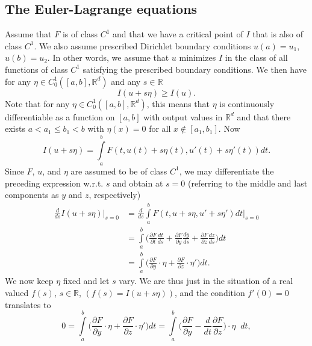 \documentclass{article}
\theoremstyle{definition}
\theoremstyle{remark}
\theoremstyle{definition}
\begin{document}
    \subsection{The Euler-Lagrange equations}
        Assume that $F$ is of class $C^1$ and that we have a critical point of $I$ that is also of class $C^1$. We also assume prescribed Dirichlet boundary conditions $u(a)=u_1$, $u(b)=u_2$. In other words, we assume that $u$ minimizes $I$ in the class of all functions of class $C^1$ satisfying the prescribed boundary conditions. We then have for any $\eta\in C_0^1([a,b],\mathbb{R}^d)$ and any $s\in\mathbb{R}$
            \begin{equation*}
                I(u+s\eta)\geq I(u).
            \end{equation*}
        \noindent Note that for any $\eta\in C_0^1([a,b],\mathbb{R}^d)$, this means that $\eta$ is continuously differentiable as a function on $[a,b]$ with output values in $\mathbb{R}^d$ and that there exists $a<a_1\leq b_1< b$ with $\eta(x)=0$ for all $x\notin[a_1,b_1]$. Now 
            \begin{equation*}
                I(u+s\eta)=\int\limits_a^b F(t,u(t)+s\eta(t),u'(t)+s\eta'(t))dt.
            \end{equation*}
        Since $F$, $u$, and $\eta$ are assumed to be of class $C^1$, we may differentiate the preceding expression w.r.t. $s$ and obtain at $s=0$ (referring to the middle and last components as $y$ and $z$, respectively)
            \begin{equation*}
                \begin{split}
                    \frac{d}{ds}I(u+s\eta)\biggr\rvert_{s=0}&=\frac{d}{ds}\int\limits_a^b F(t,u+s\eta,u'+s\eta') dt\biggr\rvert_{s=0} \\
                    &=\int\limits_a^b\bigg(\frac{\partial F}{\partial t}\frac{dt}{ds}+\frac{\partial F}{\partial y}\frac{dy}{ds}+\frac{\partial F}{\partial z}\frac{dz}{ds}\bigg) dt\\
                    &=\int\limits_a^b\bigg(\frac{\partial F}{\partial y}\cdot\eta+\frac{\partial F}{\partial z}\cdot\eta'\bigg)dt.
                \end{split}
            \end{equation*}
        \noindent We now keep $\eta$ fixed and let $s$ vary. We are thus just in the situation of a real valued $f(s)$, $s\in\mathbb{R}$, $(f(s)=I(u+s\eta))$, and the condition $f'(0)=0$ translates to 
            \begin{equation}
                0=\int\limits_a^b\bigg(\frac{\partial F}{\partial y}\cdot\eta+\frac{\partial F}{\partial z}\cdot\eta'\bigg)dt=\int\limits_a^b\bigg(\frac{\partial F}{\partial y}-\frac{d}{dt}\frac{\partial F}{\partial z}\bigg)\cdot\eta\;\; dt,
            \end{equation}
\end{document}
